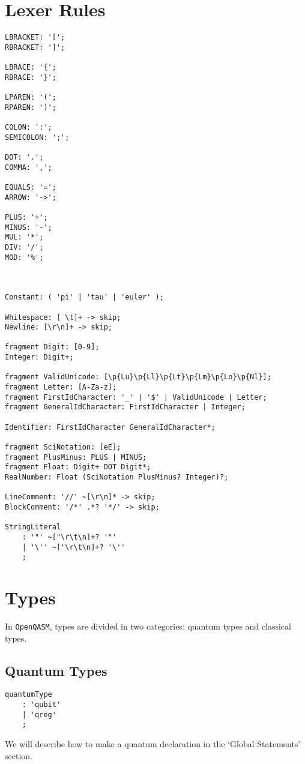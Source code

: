 \documentclass[12pt,a4paper]{report}
\theoremstyle{definition}
\theoremstyle{definition}
\theoremstyle{definition}
\begin{document}
\section{Lexer Rules}
\begin{lstlisting}
LBRACKET: '[';
RBRACKET: ']';

LBRACE: '{';
RBRACE: '}';

LPAREN: '(';
RPAREN: ')';

COLON: ':';
SEMICOLON: ';';

DOT: '.';
COMMA: ',';

EQUALS: '=';
ARROW: '->';

PLUS: '+';
MINUS: '-';
MUL: '*';
DIV: '/';
MOD: '%';



Constant: ( 'pi' | 'tau' | 'euler' );

Whitespace: [ \t]+ -> skip;
Newline: [\r\n]+ -> skip;

fragment Digit: [0-9];
Integer: Digit+;

fragment ValidUnicode: [\p{Lu}\p{Ll}\p{Lt}\p{Lm}\p{Lo}\p{Nl}];
fragment Letter: [A-Za-z];
fragment FirstIdCharacter: '_' | '$' | ValidUnicode | Letter;
fragment GeneralIdCharacter: FirstIdCharacter | Integer;

Identifier: FirstIdCharacter GeneralIdCharacter*;

fragment SciNotation: [eE];
fragment PlusMinus: PLUS | MINUS;
fragment Float: Digit+ DOT Digit*;
RealNumber: Float (SciNotation PlusMinus? Integer)?;

LineComment: '//' ~[\r\n]* -> skip;
BlockComment: '/*' .*? '*/' -> skip;

StringLiteral
    : '"' ~["\r\t\n]+? '"'
    | '\'' ~['\r\t\n]+? '\''
    ;

\end{lstlisting}


\section{Types}
In \texttt{OpenQASM}, types are divided in two categories: quantum types and classical types.
\subsection{Quantum Types}
\begin{lstlisting}
quantumType
    : 'qubit'
    | 'qreg'
    ;
\end{lstlisting}
We will describe how to make a quantum declaration in the `Global Statements' section.
\end{document}
